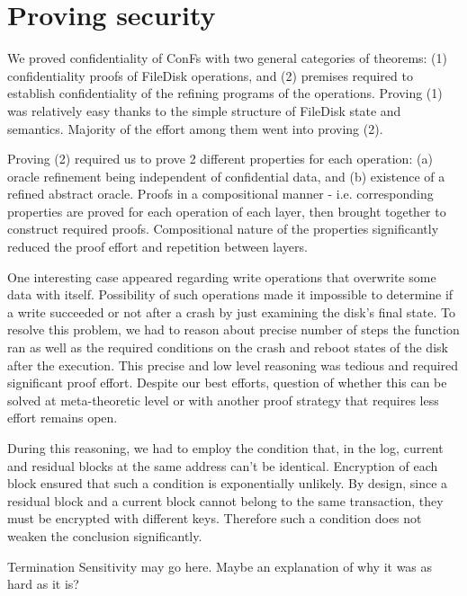 \section{Proving security}
We proved confidentiality of ConFs with two general categories of theorems: (1) confidentiality proofs of FileDisk operations, and (2) premises required to establish confidentiality of the refining programs of the operations. Proving (1) was relatively easy thanks to the simple structure of FileDisk state and semantics. Majority of the effort among them went into proving (2).

Proving (2) required us to prove 2 different properties for each operation: (a) oracle refinement being independent of confidential data, and (b) existence of a refined abstract oracle. Proofs in a compositional manner - i.e. corresponding properties are proved for each operation of each layer, then brought together to construct required proofs. Compositional nature of the properties significantly reduced the proof effort and repetition between layers.

One interesting case appeared regarding write operations that overwrite some data with itself. Possibility of such operations made it impossible to determine if a write succeeded or not after a crash by just examining the disk's final state. To resolve this problem, we had to reason about precise number of steps the function ran as well as the required conditions on the crash and reboot states of the disk after the execution.  This precise and low level reasoning was tedious and required significant proof effort. Despite our best efforts, question of whether this can be solved at meta-theoretic level or with another proof strategy that requires less effort remains open.

During this reasoning, we had to employ the condition that, in the log, current and residual blocks at the same address can't be identical. Encryption of each block ensured that such a condition is exponentially unlikely. By design, since a residual block and a current block cannot belong to the same transaction, they must be encrypted with different keys. Therefore such a condition does not weaken the conclusion significantly.


{\color{red} Termination Sensitivity may go here. Maybe an explanation of why it was as hard as it is?}

